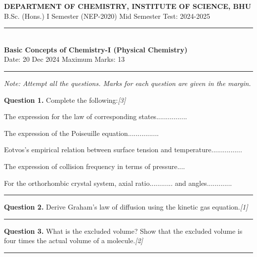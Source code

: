 \documentclass[11pt,a4paper]{article}
\newcommand{\pts}[1]{\hfill   \textit{[#1]}}
\begin{document}
\begin{center}
  {\large\bfseries DEPARTMENT OF CHEMISTRY, INSTITUTE OF SCIENCE, BHU}\\[2pt]
  {\normalsize B.Sc. (Hons.) I Semester (NEP-2020) Mid Semester Test: 2024-2025}\\[6pt]
  \rule{0.8\linewidth}{0.5pt}\\[6pt]
  {\large\bfseries Basic Concepts of Chemistry-I (Physical Chemistry)}\\[4pt]
  {\normalsize Date: 20 Dec 2024 \hfill Maximum Marks: 13}
\end{center}

\rule{\linewidth}{0.4pt}

\smallskip



\noindent   \textit{Note: Attempt all the questions. Marks for each question are given in the margin.}

\bigskip




\noindent   \textbf{Question 1.} Complete the following:\pts{3}

\begin{parts}
  \item The expression for the law of corresponding states................
  \item The expression of the Poiseuille equation................
  \item Eotvos's empirical relation between surface tension and temperature................
  \item The expression of collision frequency in terms of pressure....
  \item For the orthorhombic crystal system, axial ratio............ and angles.............
\end{parts}

\medskip\rule{\linewidth}{0.2pt}\medskip




\noindent   \textbf{Question 2.} Derive Graham's law of diffusion using the kinetic gas equation.\pts{1}

\medskip\rule{\linewidth}{0.2pt}\medskip




\noindent   \textbf{Question 3.} What is the excluded volume? Show that the excluded volume is four times the actual volume of a molecule.\pts{2}

\medskip\rule{\linewidth}{0.2pt}\medskip
\end{document}
